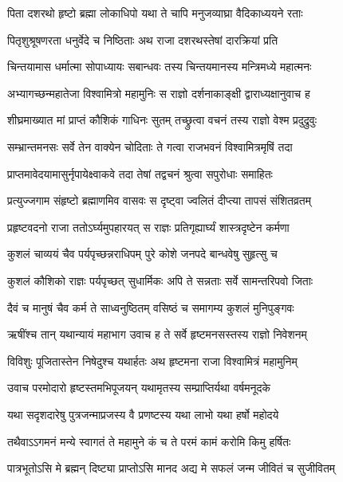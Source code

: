 \twolineshloka
{पिता दशरथो हृष्टो ब्रह्मा लोकाधिपो यथा}
{ते चापि मनुजव्याघ्रा वैदिकाध्ययने रताः} %

\twolineshloka
{पितृशुश्रूषणरता धनुर्वेदे च निष्ठिताः}
{अथ राजा दशरथस्तेषां दारक्रियां प्रति} %

\twolineshloka
{चिन्तयामास धर्मात्मा सोपाध्यायः सबान्धवः}
{तस्य चिन्तयमानस्य मन्त्रिमध्ये महात्मनः} %

\twolineshloka
{अभ्यागच्छन्महातेजा विश्वामित्रो महामुनिः}
{स राज्ञो दर्शनाकाङ्क्षी द्वाराध्यक्षानुवाच ह} %

\twolineshloka
{शीघ्रमाख्यात मां प्राप्तं कौशिकं गाधिनः सुतम्}
{तच्छ्रुत्वा वचनं तस्य राज्ञो वेश्म प्रदुद्रुवुः} %

\twolineshloka
{सम्भ्रान्तमनसः सर्वे तेन वाक्येन चोदिताः}
{ते गत्वा राजभवनं विश्वामित्रमृषिं तदा} %

\twolineshloka
{प्राप्तमावेदयामासुर्नृपायेक्ष्वाकवे तदा}
{तेषां तद्वचनं श्रुत्वा सपुरोधाः समाहितः} %

\twolineshloka
{प्रत्युज्जगाम संहृष्टो ब्रह्माणमिव वासवः}
{स दृष्ट्वा ज्वलितं दीप्त्या तापसं संशितव्रतम्} %

\twolineshloka
{प्रहृष्टवदनो राजा ततोऽर्घ्यमुपहारयत्}
{स राज्ञः प्रतिगृह्यार्घ्यं शास्त्रदृष्टेन कर्मणा} %

\twolineshloka
{कुशलं चाव्ययं चैव पर्यपृच्छन्नराधिपम्}
{पुरे कोशे जनपदे बान्धवेषु सुहृत्सु च} %

\twolineshloka
{कुशलं कौशिको राज्ञः पर्यपृच्छत् सुधार्मिकः}
{अपि ते सन्नताः सर्वे सामन्तरिपवो जिताः} %

\twolineshloka
{दैवं च मानुषं चैव कर्म ते साध्वनुष्ठितम्}
{वसिष्ठं च समागम्य कुशलं मुनिपुङ्गवः} %

\twolineshloka
{ऋषींश्च तान् यथान्यायं महाभाग उवाच ह}
{ते सर्वे हृष्टमनसस्तस्य राज्ञो निवेशनम्} %

\twolineshloka
{विविशुः पूजितास्तेन निषेदुश्च यथार्हतः}
{अथ हृष्टमना राजा विश्वामित्रं महामुनिम्} %

\twolineshloka
{उवाच परमोदारो हृष्टस्तमभिपूजयन्}
{यथामृतस्य सम्प्राप्तिर्यथा वर्षमनूदके} %

\twolineshloka
{यथा सदृशदारेषु पुत्रजन्माप्रजस्य वै}
{प्रणष्टस्य यथा लाभो यथा हर्षो महोदये} %

\twolineshloka
{तथैवाऽऽगमनं मन्ये स्वागतं ते महामुने}
{कं च ते परमं कामं करोमि किमु हर्षितः} %

\twolineshloka
{पात्रभूतोऽसि मे ब्रह्मन् दिष्ट्या प्राप्तोऽसि मानद}
{अद्य मे सफलं जन्म जीवितं च सुजीवितम्} %

